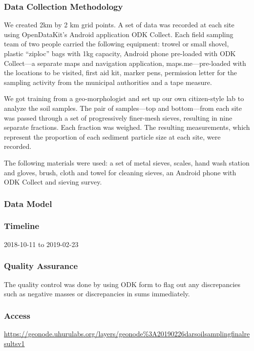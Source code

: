 \documentclass[a4paper,12pt,twoside]{article}
\begin{document}
\subsubsection{Data Collection Methodology}

\begin{multicols}{2}
We created 2km by 2 km grid points. A set of data was recorded at each site using OpenDataKit’s Android application ODK Collect. Each field sampling team of two people carried the following equipment: trowel or small shovel, plastic “ziploc” bags with 1kg capacity, Android phone pre-loaded with ODK Collect---a separate maps and navigation application, maps.me---pre-loaded with the locations to be visited, first aid kit, marker pens, permission letter for the sampling activity from the municipal authorities and a tape measure.

We got training from a geo-morphologist and set up our own citizen-style lab to analyze the soil samples. The pair of samples—top and bottom—from each site was passed through a set of progressively finer-mesh sieves, resulting in nine separate fractions. Each fraction was weighed. The resulting measurements, which represent the proportion of each sediment particle size at each site, were
recorded.

The following materials were used: a set of metal sieves, scales, hand wash station and gloves, brush, cloth and towel for cleaning sieves, an Android phone with ODK Collect and sieving survey.
\end{multicols}

\subsubsection{Data Model}

\subsubsection{Timeline}
2018-10-11 to 2019-02-23

\subsubsection{Quality Assurance}

The quality control was done by  using ODK form to flag out any discrepancies such as negative masses or discrepancies in sums immediately.

\subsubsection{Access}
\href{https://geonode.uhurulabs.org/layers/geonode\%3A_2019_02_26_dar_soil_sampling_final_results_v1}{https://geonode.uhurulabs.org/layers/geonode\%3A20190226darsoilsamplingfinalresultsv1}
\end{document}
